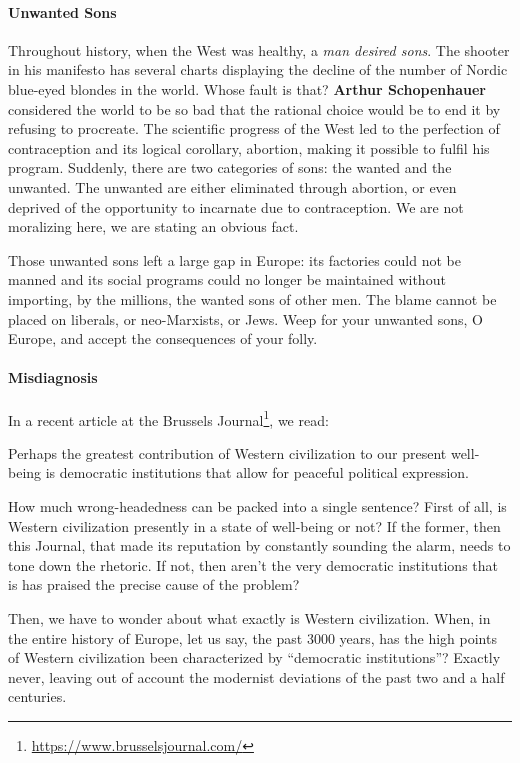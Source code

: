 \paragraph{Unwanted Sons}


Throughout history, when the West was healthy, a \emph{man desired sons}. The shooter in his manifesto has several charts displaying the decline of the number of Nordic blue-eyed blondes in the world. Whose fault is that? \textbf{Arthur Schopenhauer} considered the world to be so bad that the rational choice would be to end it by refusing to procreate. The scientific progress of the West led to the perfection of contraception and its logical corollary, abortion, making it possible to fulfil his program. Suddenly, there are two categories of sons: the wanted and the unwanted. The unwanted are either eliminated through abortion, or even deprived of the opportunity to incarnate due to contraception. We are not moralizing here, we are stating an obvious fact.

Those unwanted sons left a large gap in Europe: its factories could not be manned and its social programs could no longer be maintained without importing, by the millions, the wanted sons of other men. The blame cannot be placed on liberals, or neo-Marxists, or Jews. Weep for your unwanted sons, O Europe, and accept the consequences of your folly.

\paragraph{Misdiagnosis}


In a recent article at the Brussels Journal\footnote{\url{https://www.brusselsjournal.com/}}, we read:

\begin{quotex}
Perhaps the greatest contribution of Western civilization to our present well-being is democratic institutions that allow for peaceful political expression.
\end{quotex}


How much wrong-headedness can be packed into a single sentence? First of all, is Western civilization presently in a state of well-being or not? If the former, then this Journal, that made its reputation by constantly sounding the alarm, needs to tone down the rhetoric. If not, then aren't the very democratic institutions that is has praised the precise cause of the problem?

Then, we have to wonder about what exactly is Western civilization. When, in the entire history of Europe, let us say, the past 3000 years, has the high points of Western civilization been characterized by ``democratic institutions''? Exactly never, leaving out of account the modernist deviations of the past two and a half centuries.

